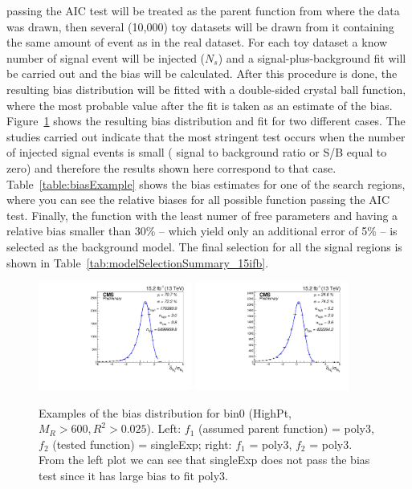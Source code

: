 passing the AIC test will be treated as the parent function from where
the data was drawn, then several (10,000) toy datasets will be drawn from
it containing the same amount of event as in the real dataset. For
each toy dataset a know number of signal event will be injected ($N_{s}$) and a signal-plus-background fit will be carried out and
the bias will be calculated. After this procedure is done, the
resulting bias distribution will be fitted with a double-sided
crystal ball function, where the most probable value after the fit is
taken as an estimate of the bias. Figure~\ref{fig:biasExample} shows
the resulting bias distribution and fit for two different
cases. The studies carried out indicate that the most stringent test
occurs when the number of injected signal events is small ( signal to
background ratio or S/B equal to zero) and therefore the results shown
here correspond to that case. Table~\ref{table:biasExample} shows the bias estimates for one of
the search regions, where you can see the relative biases for all
possible function passing the AIC test. Finally, the function with the
least numer of free parameters and having a relative bias smaller than
30\% -- which yield only an additional error of 5\% -- is selected as
the background model. The final selection for all the signal regions
is shown in Table~\ref{tab:modelSelectionSummary_15ifb}.
\begin{figure}[h]
\begin{center}
\includegraphics[width=0.45\textwidth]{hgg/doubleTailCrystalBall_biasFits_poly3_singleExp.pdf}
\includegraphics[width=0.45\textwidth]{hgg/doubleTailCrystalBall_biasFits_poly3_poly3.pdf}
\caption{Examples of the bias distribution for bin0 (HighPt, $M_R>600, R^2>0.025$). Left: $f_{1}$ (assumed parent function) = poly3, $f_{2}$ (tested function) = singleExp; right: $f_{1}$ = poly3, $f_{2}$ =  poly3. From the left plot we can see that singleExp does not pass the bias test since it has large bias to fit poly3.  }
\label{fig:biasExample}
\end{center}
\end{figure}

